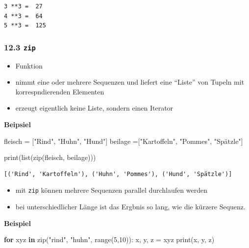 \documentclass[
  11pt,
  a4paper,
  DIV=11,
  numbers=noendperiod]{scrartcl}
\newenvironment{Shaded}{\begin{snugshade}}{\end{snugshade}}
\newcommand{\BuiltInTok}[1]{\textcolor[rgb]{0.00,0.23,0.31}{#1}}
\newcommand{\ControlFlowTok}[1]{\textcolor[rgb]{0.00,0.23,0.31}{\textbf{#1}}}
\newcommand{\DecValTok}[1]{\textcolor[rgb]{0.68,0.00,0.00}{#1}}
\newcommand{\KeywordTok}[1]{\textcolor[rgb]{0.00,0.23,0.31}{\textbf{#1}}}
\newcommand{\NormalTok}[1]{\textcolor[rgb]{0.00,0.23,0.31}{#1}}
\newcommand{\OperatorTok}[1]{\textcolor[rgb]{0.37,0.37,0.37}{#1}}
\newcommand{\StringTok}[1]{\textcolor[rgb]{0.13,0.47,0.30}{#1}}
\providecommand{\tightlist}{%
  \setlength{\itemsep}{0pt}\setlength{\parskip}{0pt}}
\begin{document}
\begin{verbatim}
3 **3 =  27
4 **3 =  64
5 **3 =  125
\end{verbatim}

\subsubsection{\texorpdfstring{12.3 \texttt{zip}}{12.3 zip}}\label{zip}

\begin{itemize}
\tightlist
\item
  Funktion
\item
  nimmt eine oder mehrere Sequenzen und liefert eine ``Liste'' von
  Tupeln mit korrespndierenden Elementen
\item
  erzeugt eigentlich keine Liste, sondern einen Iterator
\end{itemize}

\textbf{Beipsiel}

\begin{Shaded}
\begin{Highlighting}[numbers=left,,]
\NormalTok{fleisch }\OperatorTok{=}\NormalTok{ [}\StringTok{"Rind"}\NormalTok{, }\StringTok{"Huhn"}\NormalTok{, }\StringTok{"Hund"}\NormalTok{]}
\NormalTok{beilage }\OperatorTok{=}\NormalTok{[}\StringTok{"Kartoffeln"}\NormalTok{, }\StringTok{"Pommes"}\NormalTok{, }\StringTok{"Spätzle"}\NormalTok{]}

\BuiltInTok{print}\NormalTok{(}\BuiltInTok{list}\NormalTok{(}\BuiltInTok{zip}\NormalTok{(fleisch, beilage)))}
\end{Highlighting}
\end{Shaded}

\begin{verbatim}
[('Rind', 'Kartoffeln'), ('Huhn', 'Pommes'), ('Hund', 'Spätzle')]
\end{verbatim}

\begin{itemize}
\tightlist
\item
  mit \texttt{zip} können mehrere Sequenzen parallel durchlaufen werden
\item
  bei unterschiedlicher Länge ist das Ergbnis so lang, wie die kürzere
  Sequenz.
\end{itemize}

\textbf{Beispiel}

\begin{Shaded}
\begin{Highlighting}[numbers=left,,]
\ControlFlowTok{for}\NormalTok{ xyz }\KeywordTok{in} \BuiltInTok{zip}\NormalTok{(}\StringTok{"rind"}\NormalTok{, }\StringTok{"huhn"}\NormalTok{, }\BuiltInTok{range}\NormalTok{(}\DecValTok{5}\NormalTok{,}\DecValTok{10}\NormalTok{)):}
\NormalTok{    x, y, z }\OperatorTok{=}\NormalTok{ xyz}
    \BuiltInTok{print}\NormalTok{(x, y, z)}
\end{Highlighting}
\end{Shaded}
\end{document}
